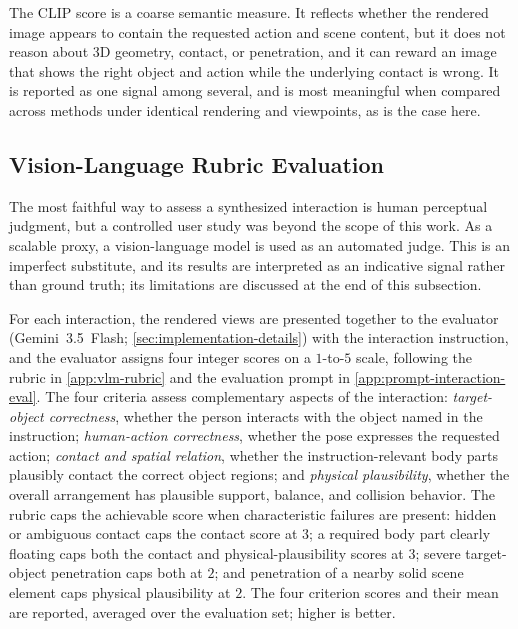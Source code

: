 The CLIP score is a coarse semantic measure. It reflects whether the rendered image appears to contain the requested action and scene content, but it does not reason about 3D geometry, contact, or penetration, and it can reward an image that shows the right object and action while the underlying contact is wrong. It is reported as one signal among several, and is most meaningful when compared across methods under identical rendering and viewpoints, as is the case here.

\subsection{Vision-Language Rubric Evaluation}
\label{sec:exp-metrics-vlm}

The most faithful way to assess a synthesized interaction is human perceptual judgment, but a controlled user study was beyond the scope of this work. As a scalable proxy, a vision-language model is used as an automated judge. This is an imperfect substitute, and its results are interpreted as an indicative signal rather than ground truth; its limitations are discussed at the end of this subsection.

For each interaction, the rendered views are presented together to the evaluator (Gemini~3.5~Flash; \cref{sec:implementation-details}) with the interaction instruction, and the evaluator assigns four integer scores on a $1$-to-$5$ scale, following the rubric in \cref{app:vlm-rubric} and the evaluation prompt in \cref{app:prompt-interaction-eval}. The four criteria assess complementary aspects of the interaction: \emph{target-object correctness}, whether the person interacts with the object named in the instruction; \emph{human-action correctness}, whether the pose expresses the requested action; \emph{contact and spatial relation}, whether the instruction-relevant body parts plausibly contact the correct object regions; and \emph{physical plausibility}, whether the overall arrangement has plausible support, balance, and collision behavior. The rubric caps the achievable score when characteristic failures are present: hidden or ambiguous contact caps the contact score at $3$; a required body part clearly floating caps both the contact and physical-plausibility scores at $3$; severe target-object penetration caps both at $2$; and penetration of a nearby solid scene element caps physical plausibility at $2$. The four criterion scores and their mean are reported, averaged over the evaluation set; higher is better.

